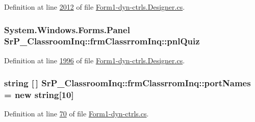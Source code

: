 \-Definition at line \hyperlink{_form1-dyn-ctrls_8_designer_8cs_source_l02012}{2012} of file \hyperlink{_form1-dyn-ctrls_8_designer_8cs_source}{\-Form1-\/dyn-\/ctrls.\-Designer.\-cs}.

\hypertarget{class_sr_p___classroom_inq_1_1frm_classrrom_inq_a482ea3246ef232cad6430e85e54a0e3a}{
\subsubsection[{pnl\-Quiz}]{\setlength{\rightskip}{0pt plus 5cm}\-System.\-Windows.\-Forms.\-Panel {\bf \-Sr\-P\-\_\-\-Classroom\-Inq\-::frm\-Classrrom\-Inq\-::pnl\-Quiz}}}
\label{class_sr_p___classroom_inq_1_1frm_classrrom_inq_a482ea3246ef232cad6430e85e54a0e3a}


\-Definition at line \hyperlink{_form1-dyn-ctrls_8_designer_8cs_source_l01996}{1996} of file \hyperlink{_form1-dyn-ctrls_8_designer_8cs_source}{\-Form1-\/dyn-\/ctrls.\-Designer.\-cs}.

\hypertarget{class_sr_p___classroom_inq_1_1frm_classrrom_inq_a9c5b06a44069e68e732d7bcd7a8fa08c}{
\subsubsection[{port\-Names}]{\setlength{\rightskip}{0pt plus 5cm}string \mbox{[}$\,$\mbox{]} {\bf \-Sr\-P\-\_\-\-Classroom\-Inq\-::frm\-Classrrom\-Inq\-::port\-Names} = new string\mbox{[}10\mbox{]}}}
\label{class_sr_p___classroom_inq_1_1frm_classrrom_inq_a9c5b06a44069e68e732d7bcd7a8fa08c}


\-Definition at line \hyperlink{_form1-dyn-ctrls_8cs_source_l00070}{70} of file \hyperlink{_form1-dyn-ctrls_8cs_source}{\-Form1-\/dyn-\/ctrls.\-cs}.


